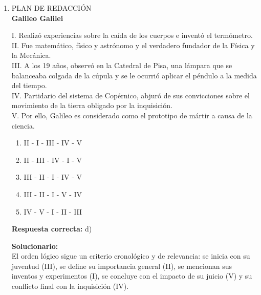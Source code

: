 \begin{enumerate}
	\textbf{Respuesta correcta:} e)
	
	\vspace{2mm}
	\textbf{Solucionario:}\\
	La relación es de proceso a producto: la sedimentación genera el estrato (una capa de sedimentos). De manera análoga, una base constituye el fundamento o soporte de una capa en diversas estructuras o formaciones.
	
	\vspace{6mm}
	
	\item PLAN DE REDACCIÓN \\
	\textbf{Galileo Galilei}
	
	I. Realizó experiencias sobre la caída de los cuerpos e inventó el termómetro. \\
	II. Fue matemático, físico y astrónomo y el verdadero fundador de la Física y la Mecánica. \\
	III. A los 19 años, observó en la Catedral de Pisa, una lámpara que se balanceaba colgada de la cúpula y se le ocurrió aplicar el péndulo a la medida del tiempo. \\
	IV. Partidario del sistema de Copérnico, abjuró de sus convicciones sobre el movimiento de la tierra obligado por la inquisición. \\
	V. Por ello, Galileo es considerado como el prototipo de mártir a causa de la ciencia.
	
	\begin{enumerate}[label=\alph*)]
		\item II - I - III - IV - V
		\item II - III - IV - I - V
		\item III - II - I - IV - V
		\item III - II - I - V - IV
		\item IV - V - I - II - III
	\end{enumerate}
	
	\textbf{Respuesta correcta:} d)
	
	\vspace{2mm}
	\textbf{Solucionario:}\\
	El orden lógico sigue un criterio cronológico y de relevancia: se inicia con su juventud (III), se define su importancia general (II), se mencionan sus inventos y experimentos (I), se concluye con el impacto de su juicio (V) y su conflicto final con la inquisición (IV).
	
	\vspace{6mm}
	

\end{enumerate}
